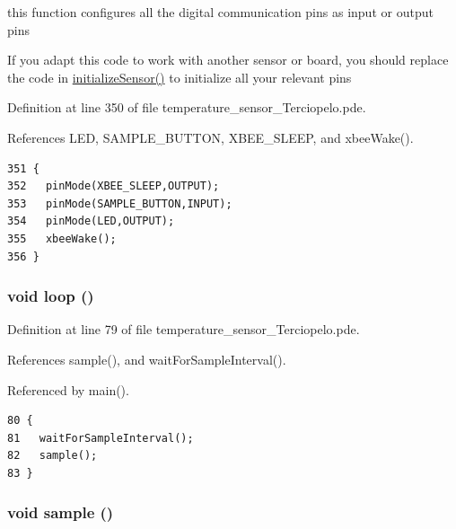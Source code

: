this function configures all the digital communication pins as input or output pins 

If you adapt this code to work with another sensor or board, you should replace the code in \hyperlink{applet_2temperature__sensor__board__v2_8h_f6c9587ccbcf223f8c79f508c2fef366}{initializeSensor()} to initialize all your relevant pins 

Definition at line 350 of file temperature\_\-sensor\_\-Terciopelo.pde.

References LED, SAMPLE\_\-BUTTON, XBEE\_\-SLEEP, and xbeeWake().

\begin{Code}\begin{verbatim}351 {
352   pinMode(XBEE_SLEEP,OUTPUT);
353   pinMode(SAMPLE_BUTTON,INPUT);
354   pinMode(LED,OUTPUT);
355   xbeeWake();
356 }  
\end{verbatim}
\end{Code}


\hypertarget{temperature__sensor___terciopelo_8pde_fe461d27b9c48d5921c00d521181f12f}{
\subsubsection[{loop}]{\setlength{\rightskip}{0pt plus 5cm}void loop ()}}
\label{temperature__sensor___terciopelo_8pde_fe461d27b9c48d5921c00d521181f12f}




Definition at line 79 of file temperature\_\-sensor\_\-Terciopelo.pde.

References sample(), and waitForSampleInterval().

Referenced by main().

\begin{Code}\begin{verbatim}80 {
81   waitForSampleInterval();
82   sample();
83 }
\end{verbatim}
\end{Code}


\hypertarget{temperature__sensor___terciopelo_8pde_50a2ce599e896bfb535e70a42003ed23}{
\subsubsection[{sample}]{\setlength{\rightskip}{0pt plus 5cm}void sample ()}}
\label{temperature__sensor___terciopelo_8pde_50a2ce599e896bfb535e70a42003ed23}




